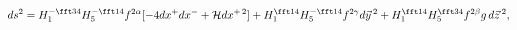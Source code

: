 \begin{equation}
ds^2=H_1^{-\fft34}H_5^{-\fft14}f^{2\alpha}[-4dx^+dx^-+{\cal H}dx^{+\,2}]
+H_1^{\fft14}H_5^{-\fft14}f^{2\gamma}d\vec y\,^2
+H_1^{\fft14}H_5^{\fft34}f^{2\beta}g\,d\vec z\,^2,
\end{equation}

